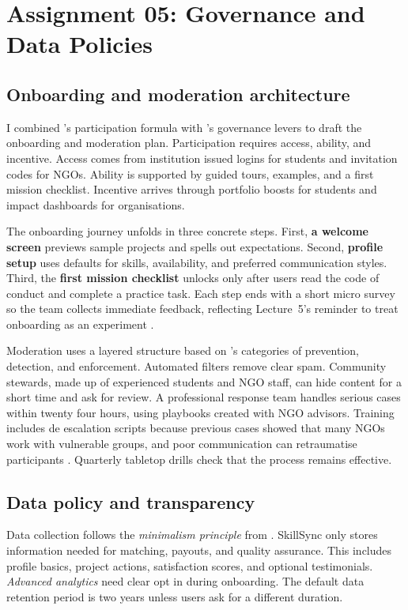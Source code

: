 \section*{Assignment 05: Governance and Data Policies}

\subsection*{Onboarding and moderation architecture}
I combined \citet{Choudary2016}'s participation formula with \citet{Reillier2017}'s governance levers to draft the onboarding and moderation plan. Participation requires access, ability, and incentive. Access comes from institution issued logins for students and invitation codes for NGOs. Ability is supported by guided tours, examples, and a first mission checklist. Incentive arrives through portfolio boosts for students and impact dashboards for organisations.

The onboarding journey unfolds in three concrete steps. First, \textbf{a welcome screen} previews sample projects and spells out expectations. Second, \textbf{profile setup} uses defaults for skills, availability, and preferred communication styles. Third, the \textbf{first mission checklist} unlocks only after users read the code of conduct and complete a practice task. Each step ends with a short micro survey so the team collects immediate feedback, reflecting Lecture~5's reminder to treat onboarding as an experiment \citep{Lecture05}.

Moderation uses a layered structure based on \citet{Choudary2016}'s categories of prevention, detection, and enforcement. Automated filters remove clear spam. Community stewards, made up of experienced students and NGO staff, can hide content for a short time and ask for review. A professional response team handles serious cases within twenty four hours, using playbooks created with NGO advisors. Training includes de escalation scripts because previous cases showed that many NGOs work with vulnerable groups, and poor communication can retraumatise participants \citep{Lecture11}. Quarterly tabletop drills check that the process remains effective.

\subsection*{Data policy and transparency}
Data collection follows the \textit{minimalism principle} from \citet{Zuboff2019}. SkillSync only stores information needed for matching, payouts, and quality assurance. This includes profile basics, project actions, satisfaction scores, and optional testimonials. \textit{Advanced analytics} need clear opt in during onboarding. The default data retention period is two years unless users ask for a different duration.

